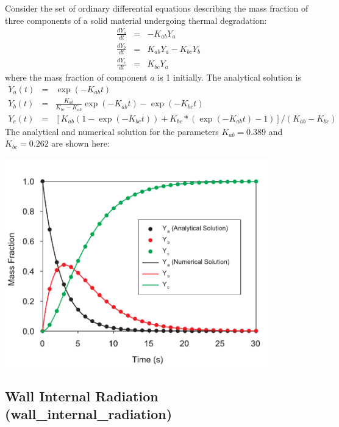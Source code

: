 \documentclass[11pt]{book}
\begin{document}
Consider  the set  of ordinary  differential equations  describing the
mass  fraction of  three  components of  a  solid material  undergoing
thermal degradation:
\begin{eqnarray}
    \frac{dY_a}{dt} &=&  -K_{ab} Y_a \nonumber  \\
    \frac{dY_b}{dt} &=&   K_{ab} Y_a  -  K_{bc}  Y_b  \\
    \frac{dY_c}{dt} &=&   K_{bc} Y_a
    \nonumber
\end{eqnarray}
where  the  mass  fraction  of  component  $a$  is  1  initially.  The
analytical solution is~\cite{Lautenberger:2006}
\begin{eqnarray}
    Y_a(t)    &=&    \exp(-K_{ab}t)    \nonumber   \\
    Y_b(t)    &=&    \frac{K_{ab}}{K_{bc}-K_{ab}} \exp(-K_{ab} t)  - \exp(-K_{bc} t) \\
    Y_c(t)    &=&    \left[   K_{ab}    (1-\exp(-K_{bc} t) )    +  K_{bc}*(\exp(-K_{ab} t) -1) \right] / (K_{ab}-K_{bc})
\end{eqnarray}
The analytical and  numerical solution
for the parameters $K_{ab} = 0.389$ and $K_{bc} = 0.262$ are shown here:

\begin{center}
\includegraphics[width=4.5in]{FIGURES/two_step_solid_reaction_Mass_Fractions}
\end{center}




\clearpage
\subsection{Wall Internal Radiation ({\bf wall\_internal\_radiation}) }
\label{wall_internal_radiation}
\end{document}
